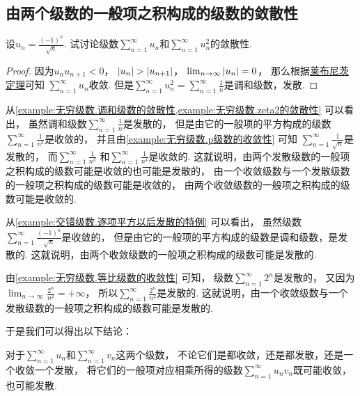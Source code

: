 \subsection{由两个级数的一般项之积构成的级数的敛散性}
\begin{example}\label{example:交错级数.逐项平方以后发散的特例}
设\(u_n = \frac{(-1)^n}{\sqrt{n}}\).
试讨论级数\(\sum_{n=1}^\infty u_n\)和\(\sum_{n=1}^\infty u_n^2\)的敛散性.
\begin{proof}
因为\(u_n u_{n+1} < 0\)，
\(\abs{u_n} > \abs{u_{n+1}}\)，
\(\lim_{n\to\infty} \abs{u_n} = 0\)，
那么根据\hyperref[theorem:无穷级数.莱布尼茨定理]{莱布尼茨定理}可知
\(\sum_{n=1}^\infty u_n\)收敛.
但是\(\sum_{n=1}^\infty u_n^2
= \sum_{n=1}^\infty \frac{1}{n}\)是调和级数，发散.
\end{proof}
\end{example}

从\cref{example:无穷级数.调和级数的敛散性,example:无穷级数.zeta2的敛散性} 可以看出，
虽然调和级数\(\sum_{n=1}^\infty \frac1n\)是发散的，
但是由它的一般项的平方构成的级数\(\sum_{n=1}^\infty \frac1{n^2}\)是收敛的，
并且由\cref{example:无穷级数.p级数的收敛性} 可知
\(\sum_{n=1}^\infty \frac1{\sqrt{n}}\)是发散的，
而\(\sum_{n=1}^\infty \frac1{n^3}\)
和\(\sum_{n=1}^\infty \frac1{n^4}\)是收敛的.
这就说明，由两个发散级数的一般项之积构成的级数可能是收敛的也可能是发散的，
由一个收敛级数与一个发散级数的一般项之积构成的级数可能是收敛的，
由两个收敛级数的一般项之积构成的级数可能是收敛的.

从\cref{example:交错级数.逐项平方以后发散的特例} 可以看出，
虽然级数\(\sum_{n=1}^\infty \frac{(-1)^n}{\sqrt{n}}\)是收敛的，
但是由它的一般项的平方构成的级数是调和级数，是发散的.
这就说明，由两个收敛级数的一般项之积构成的级数可能是发散的.

由\cref{example:无穷级数.等比级数的收敛性} 可知，
级数\(\sum_{n=1}^\infty 2^n\)是发散的，
又因为\(\lim_{n\to\infty} \frac{2^n}{n^2} = +\infty\)，
所以\(\sum_{n=1}^\infty \frac{2^n}{n^2}\)是发散的.
这就说明，由一个收敛级数与一个发散级数的一般项之积构成的级数可能是发散的.

于是我们可以得出以下结论：
\begin{proposition}
对于\(\sum_{n=1}^\infty u_n\)和\(\sum_{n=1}^\infty v_n\)这两个级数，
不论它们是都收敛，还是都发散，还是一个收敛一个发散，
将它们的一般项对应相乘所得的级数\(\sum_{n=1}^\infty u_n v_n\)既可能收敛，也可能发散.
\end{proposition}
